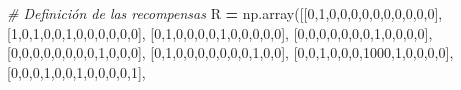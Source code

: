 \documentclass[
]{book}
\newenvironment{Shaded}{\begin{snugshade}}{\end{snugshade}}
\newcommand{\CommentTok}[1]{\textcolor[rgb]{0.56,0.35,0.01}{\textit{#1}}}
\newcommand{\DecValTok}[1]{\textcolor[rgb]{0.00,0.00,0.81}{#1}}
\newcommand{\NormalTok}[1]{#1}
\newcommand{\OperatorTok}[1]{\textcolor[rgb]{0.81,0.36,0.00}{\textbf{#1}}}
\begin{document}
\begin{Shaded}
\begin{Highlighting}[]
\CommentTok{\# Definición de las recompensas}
\NormalTok{R }\OperatorTok{=}\NormalTok{ np.array([[}\DecValTok{0}\NormalTok{,}\DecValTok{1}\NormalTok{,}\DecValTok{0}\NormalTok{,}\DecValTok{0}\NormalTok{,}\DecValTok{0}\NormalTok{,}\DecValTok{0}\NormalTok{,}\DecValTok{0}\NormalTok{,}\DecValTok{0}\NormalTok{,}\DecValTok{0}\NormalTok{,}\DecValTok{0}\NormalTok{,}\DecValTok{0}\NormalTok{,}\DecValTok{0}\NormalTok{],}
\NormalTok{              [}\DecValTok{1}\NormalTok{,}\DecValTok{0}\NormalTok{,}\DecValTok{1}\NormalTok{,}\DecValTok{0}\NormalTok{,}\DecValTok{0}\NormalTok{,}\DecValTok{1}\NormalTok{,}\DecValTok{0}\NormalTok{,}\DecValTok{0}\NormalTok{,}\DecValTok{0}\NormalTok{,}\DecValTok{0}\NormalTok{,}\DecValTok{0}\NormalTok{,}\DecValTok{0}\NormalTok{],}
\NormalTok{              [}\DecValTok{0}\NormalTok{,}\DecValTok{1}\NormalTok{,}\DecValTok{0}\NormalTok{,}\DecValTok{0}\NormalTok{,}\DecValTok{0}\NormalTok{,}\DecValTok{0}\NormalTok{,}\DecValTok{1}\NormalTok{,}\DecValTok{0}\NormalTok{,}\DecValTok{0}\NormalTok{,}\DecValTok{0}\NormalTok{,}\DecValTok{0}\NormalTok{,}\DecValTok{0}\NormalTok{],}
\NormalTok{              [}\DecValTok{0}\NormalTok{,}\DecValTok{0}\NormalTok{,}\DecValTok{0}\NormalTok{,}\DecValTok{0}\NormalTok{,}\DecValTok{0}\NormalTok{,}\DecValTok{0}\NormalTok{,}\DecValTok{0}\NormalTok{,}\DecValTok{1}\NormalTok{,}\DecValTok{0}\NormalTok{,}\DecValTok{0}\NormalTok{,}\DecValTok{0}\NormalTok{,}\DecValTok{0}\NormalTok{],}
\NormalTok{              [}\DecValTok{0}\NormalTok{,}\DecValTok{0}\NormalTok{,}\DecValTok{0}\NormalTok{,}\DecValTok{0}\NormalTok{,}\DecValTok{0}\NormalTok{,}\DecValTok{0}\NormalTok{,}\DecValTok{0}\NormalTok{,}\DecValTok{0}\NormalTok{,}\DecValTok{1}\NormalTok{,}\DecValTok{0}\NormalTok{,}\DecValTok{0}\NormalTok{,}\DecValTok{0}\NormalTok{],}
\NormalTok{              [}\DecValTok{0}\NormalTok{,}\DecValTok{1}\NormalTok{,}\DecValTok{0}\NormalTok{,}\DecValTok{0}\NormalTok{,}\DecValTok{0}\NormalTok{,}\DecValTok{0}\NormalTok{,}\DecValTok{0}\NormalTok{,}\DecValTok{0}\NormalTok{,}\DecValTok{0}\NormalTok{,}\DecValTok{1}\NormalTok{,}\DecValTok{0}\NormalTok{,}\DecValTok{0}\NormalTok{],}
\NormalTok{              [}\DecValTok{0}\NormalTok{,}\DecValTok{0}\NormalTok{,}\DecValTok{1}\NormalTok{,}\DecValTok{0}\NormalTok{,}\DecValTok{0}\NormalTok{,}\DecValTok{0}\NormalTok{,}\DecValTok{1000}\NormalTok{,}\DecValTok{1}\NormalTok{,}\DecValTok{0}\NormalTok{,}\DecValTok{0}\NormalTok{,}\DecValTok{0}\NormalTok{,}\DecValTok{0}\NormalTok{],}
\NormalTok{              [}\DecValTok{0}\NormalTok{,}\DecValTok{0}\NormalTok{,}\DecValTok{0}\NormalTok{,}\DecValTok{1}\NormalTok{,}\DecValTok{0}\NormalTok{,}\DecValTok{0}\NormalTok{,}\DecValTok{1}\NormalTok{,}\DecValTok{0}\NormalTok{,}\DecValTok{0}\NormalTok{,}\DecValTok{0}\NormalTok{,}\DecValTok{0}\NormalTok{,}\DecValTok{1}\NormalTok{],}

\end{Highlighting}
\end{Shaded}
\end{document}
